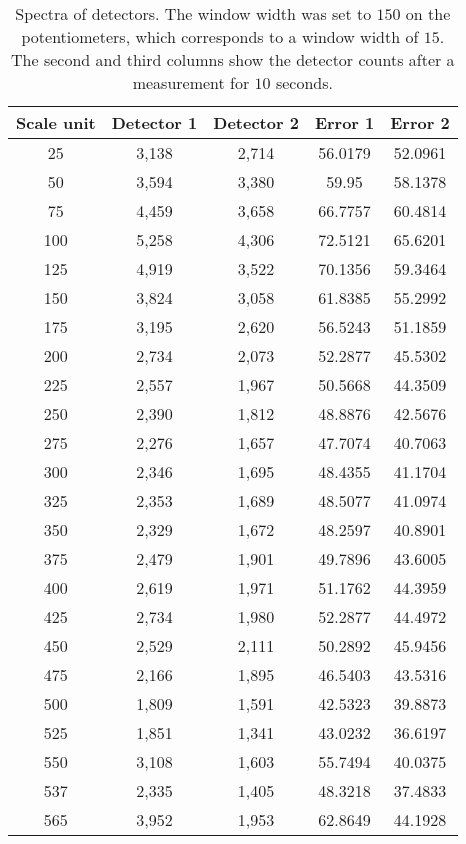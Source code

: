 \documentclass{article}
\begin{document}
\begin{table}
\caption{Spectra of detectors. The window width was set to $150$ on the potentiometers, which corresponds to a window width of $15$. The second and third columns show the detector counts after a measurement for $10$ seconds.}
\centering
\begin{tabular}{|*{5}{c|}}
\hline
Scale unit &	Detector 1 & Detector 2 & Error 1 &	Error 2
\\[0.5ex]
\hline\hline 
25 & 	3,138 & 2,714 & 56.0179 & 52.0961 \\ \hline 
50 & 	3,594 & 3,380 & 59.95 & 58.1378 \\ \hline 
75 & 	4,459 & 3,658 & 66.7757 & 60.4814 \\ \hline 
100 & 	5,258 & 4,306 & 72.5121 & 65.6201 \\ \hline 
125 & 	4,919 & 3,522 & 70.1356 & 59.3464 \\ \hline 
150 & 	3,824 & 3,058 & 61.8385 & 55.2992 \\ \hline 
175 & 	3,195 & 2,620 & 56.5243 & 51.1859 \\ \hline 
200 & 	2,734 & 2,073 & 52.2877 & 45.5302 \\ \hline 
225 & 	2,557 & 1,967 & 50.5668 & 44.3509 \\ \hline 
250 & 	2,390 & 1,812 & 48.8876 & 42.5676 \\ \hline 
275 & 	2,276 & 1,657 & 47.7074 & 40.7063 \\ \hline 
300 & 	2,346 & 1,695 & 48.4355 & 41.1704 \\ \hline 
325 & 	2,353 & 1,689 & 48.5077 & 41.0974 \\ \hline 
350 & 	2,329 & 1,672 & 48.2597 & 40.8901 \\ \hline 
375 & 	2,479 & 1,901 & 49.7896 & 43.6005 \\ \hline 
400 & 	2,619 & 1,971 & 51.1762 & 44.3959 \\ \hline 
425 & 	2,734 & 1,980 & 52.2877 & 44.4972 \\ \hline 
450 & 	2,529 & 2,111 & 50.2892 & 45.9456 \\ \hline 
475 & 	2,166 & 1,895 & 46.5403 & 43.5316 \\ \hline 
500 & 	1,809 & 1,591 & 42.5323 & 39.8873 \\ \hline 
525 & 	1,851 & 1,341 & 43.0232 & 36.6197 \\ \hline 
550 & 	3,108 & 1,603 & 55.7494 & 40.0375 \\ \hline 
537 & 	2,335 & 1,405 & 48.3218 & 37.4833 \\ \hline 
565 & 	3,952 & 1,953 & 62.8649 & 44.1928 \\ \hline 

\end{tabular}
\end{table}
\end{document}
